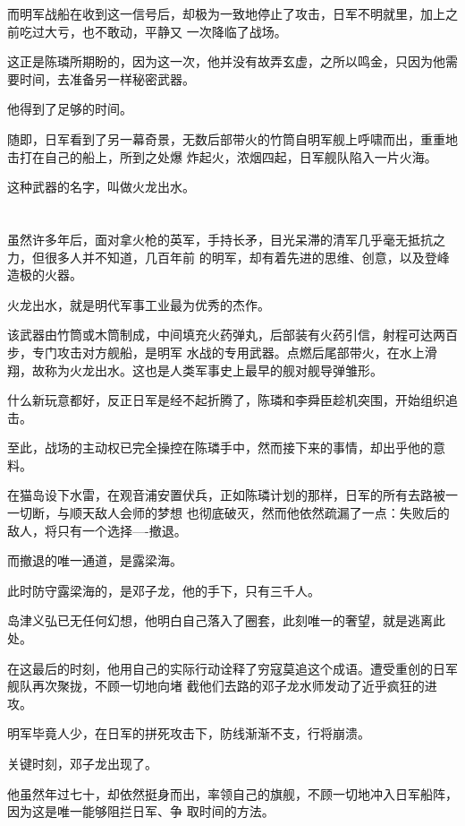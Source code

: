 \documentclass[11pt,a4paper,onecolumn]{article}
\begin{document}
而明军战船在收到这一信号后，却极为一致地停止了攻击，日军不明就里，加上之前吃过大亏，也不敢动，平静又
一次降临了战场。

这正是陈璘所期盼的，因为这一次，他并没有故弄玄虚，之所以鸣金，只因为他需要时间，去准备另一样秘密武器。

他得到了足够的时间。

随即，日军看到了另一幕奇景，无数后部带火的竹筒自明军舰上呼啸而出，重重地击打在自己的船上，所到之处爆
炸起火，浓烟四起，日军舰队陷入一片火海。

这种武器的名字，叫做火龙出水。

\section[\thesection]{}

虽然许多年后，面对拿火枪的英军，手持长矛，目光呆滞的清军几乎毫无抵抗之力，但很多人并不知道，几百年前
的明军，却有着先进的思维、创意，以及登峰造极的火器。

火龙出水，就是明代军事工业最为优秀的杰作。

该武器由竹筒或木筒制成，中间填充火药弹丸，后部装有火药引信，射程可达两百步，专门攻击对方舰船，是明军
水战的专用武器。点燃后尾部带火，在水上滑翔，故称为火龙出水。这也是人类军事史上最早的舰对舰导弹雏形。

什么新玩意都好，反正日军是经不起折腾了，陈璘和李舜臣趁机突围，开始组织追击。

至此，战场的主动权已完全操控在陈璘手中，然而接下来的事情，却出乎他的意料。

在猫岛设下水雷，在观音浦安置伏兵，正如陈璘计划的那样，日军的所有去路被一一切断，与顺天敌人会师的梦想
也彻底破灭，然而他依然疏漏了一点：失败后的敌人，将只有一个选择----撤退。

而撤退的唯一通道，是露梁海。

此时防守露梁海的，是邓子龙，他的手下，只有三千人。

岛津义弘已无任何幻想，他明白自己落入了圈套，此刻唯一的奢望，就是逃离此处。

在这最后的时刻，他用自己的实际行动诠释了穷寇莫追这个成语。遭受重创的日军舰队再次聚拢，不顾一切地向堵
截他们去路的邓子龙水师发动了近乎疯狂的进攻。

明军毕竟人少，在日军的拼死攻击下，防线渐渐不支，行将崩溃。

关键时刻，邓子龙出现了。

他虽然年过七十，却依然挺身而出，率领自己的旗舰，不顾一切地冲入日军船阵，因为这是唯一能够阻拦日军、争
取时间的方法。
\end{document}
